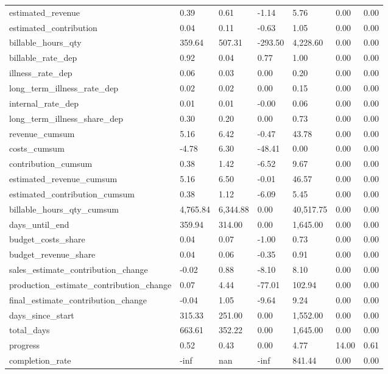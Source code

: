 \begin{landscape}
\begin{longtable}[h!]{lllllll}
estimated_revenue & 0.39 & 0.61 & -1.14 & 5.76 & 0.00 & 0.00 \\
estimated_contribution & 0.04 & 0.11 & -0.63 & 1.05 & 0.00 & 0.00 \\
billable_hours_qty & 359.64 & 507.31 & -293.50 & 4,228.60 & 0.00 & 0.00 \\
billable_rate_dep & 0.92 & 0.04 & 0.77 & 1.00 & 0.00 & 0.00 \\
illness_rate_dep & 0.06 & 0.03 & 0.00 & 0.20 & 0.00 & 0.00 \\
long_term_illness_rate_dep & 0.02 & 0.02 & 0.00 & 0.15 & 0.00 & 0.00 \\
internal_rate_dep & 0.01 & 0.01 & -0.00 & 0.06 & 0.00 & 0.00 \\
long_term_illness_share_dep & 0.30 & 0.20 & 0.00 & 0.73 & 0.00 & 0.00 \\
revenue_cumsum & 5.16 & 6.42 & -0.47 & 43.78 & 0.00 & 0.00 \\
costs_cumsum & -4.78 & 6.30 & -48.41 & 0.00 & 0.00 & 0.00 \\
contribution_cumsum & 0.38 & 1.42 & -6.52 & 9.67 & 0.00 & 0.00 \\
estimated_revenue_cumsum & 5.16 & 6.50 & -0.01 & 46.57 & 0.00 & 0.00 \\
estimated_contribution_cumsum & 0.38 & 1.12 & -6.09 & 5.45 & 0.00 & 0.00 \\
billable_hours_qty_cumsum & 4,765.84 & 6,344.88 & 0.00 & 40,517.75 & 0.00 & 0.00 \\
days_until_end & 359.94 & 314.00 & 0.00 & 1,645.00 & 0.00 & 0.00 \\
budget_costs_share & 0.04 & 0.07 & -1.00 & 0.73 & 0.00 & 0.00 \\
budget_revenue_share & 0.04 & 0.06 & -0.35 & 0.91 & 0.00 & 0.00 \\
sales_estimate_contribution_change & -0.02 & 0.88 & -8.10 & 8.10 & 0.00 & 0.00 \\
production_estimate_contribution_change & 0.07 & 4.44 & -77.01 & 102.94 & 0.00 & 0.00 \\
final_estimate_contribution_change & -0.04 & 1.05 & -9.64 & 9.24 & 0.00 & 0.00 \\
days_since_start & 315.33 & 251.00 & 0.00 & 1,552.00 & 0.00 & 0.00 \\
total_days & 663.61 & 352.22 & 0.00 & 1,645.00 & 0.00 & 0.00 \\
progress & 0.52 & 0.43 & 0.00 & 4.77 & 14.00 & 0.61 \\
completion_rate & -inf & nan & -inf & 841.44 & 0.00 & 0.00 \\

\end{longtable}
\end{landscape}
